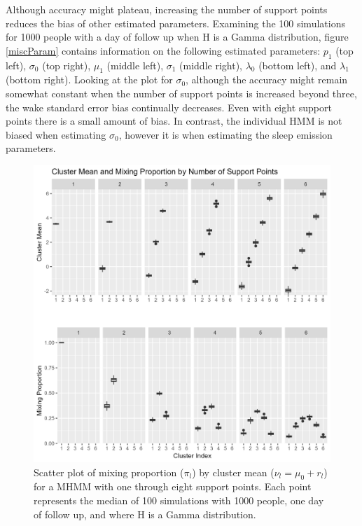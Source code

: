 \documentclass[num-refs]{wiley-article}
\begin{document}
Although accuracy might plateau, increasing the number of support points reduces the bias of other estimated parameters. Examining the 100 simulations for 1000 people with a day of follow up when H is a Gamma distribution, figure \ref{miscParam} contains information on the following estimated parameters: $p_1$ (top left), $\sigma_0$ (top right), $\mu_1$ (middle left), $\sigma_1$ (middle right), $\lambda_0$ (bottom left), and $\lambda_1$ (bottom right). Looking at the plot for $\sigma_0$, although the accuracy might remain somewhat constant when the number of support points is increased beyond three, the wake standard error bias continually decreases. Even with eight support points there is a small amount of bias. In contrast, the individual HMM is not biased when estimating $\sigma_0$, however it is when estimating the sleep emission parameters. 

\begin{figure}
    \includegraphics[scale=.48]{Support/clustmeanmix.png}
    \centering
    \caption{Scatter plot of mixing proportion ($\pi_l$) by cluster mean ($\nu_l = \mu_0+r_l$) for a MHMM with one through eight support points. Each point represents the median of 100 simulations with 1000 people, one day of follow up, and where H is a Gamma distribution.}
    \label{CMM}
\end{figure}
\end{document}
